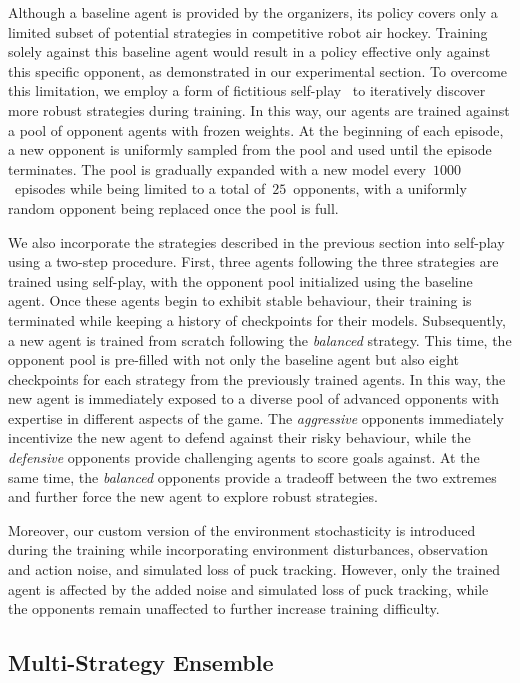 \documentclass{article}
\begin{document}
Although a baseline agent is provided by the organizers, its policy covers only a limited subset of potential strategies in competitive robot air hockey. Training solely against this baseline agent would result in a policy effective only against this specific opponent, as demonstrated in our experimental section. To overcome this limitation, we employ a form of fictitious self-play~\cite{heinrich2015fictitious} to iteratively discover more robust strategies during training. In this way, our agents are trained against a pool of opponent agents with frozen weights. At the beginning of each episode, a new opponent is uniformly sampled from the pool and used until the episode terminates. The pool is gradually expanded with a new model every~\(1000\)~episodes while being limited to a total of~\(25\)~opponents, with a uniformly random opponent being replaced once the pool is full.

We also incorporate the strategies described in the previous section into self-play using a two-step procedure. First, three agents following the three strategies are trained using self-play, with the opponent pool initialized using the baseline agent. Once these agents begin to exhibit stable behaviour, their training is terminated while keeping a history of checkpoints for their models. Subsequently, a new agent is trained from scratch following the \textit{balanced} strategy. This time, the opponent pool is pre-filled with not only the baseline agent but also eight checkpoints for each strategy from the previously trained agents. In this way, the new agent is immediately exposed to a diverse pool of advanced opponents with expertise in different aspects of the game. The \textit{aggressive} opponents immediately incentivize the new agent to defend against their risky behaviour, while the \textit{defensive} opponents provide challenging agents to score goals against. At the same time, the \textit{balanced} opponents provide a tradeoff between the two extremes and further force the new agent to explore robust strategies.

Moreover, our custom version of the environment stochasticity is introduced during the training while incorporating environment disturbances, observation and action noise, and simulated loss of puck tracking. However, only the trained agent is affected by the added noise and simulated loss of puck tracking, while the opponents remain unaffected to further increase training difficulty.

\subsection{Multi-Strategy Ensemble}\label{ssec:multi-strategy-ensemble}
\end{document}
